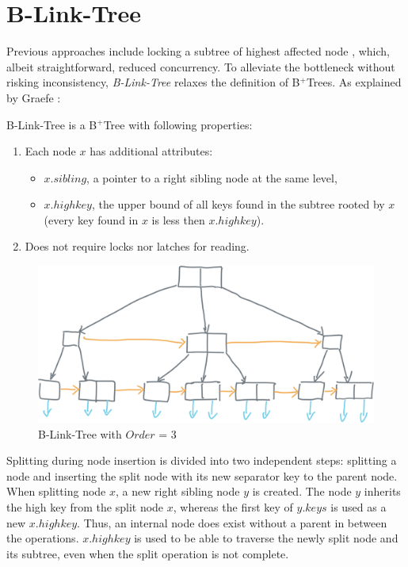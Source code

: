 \section{B-Link-Tree}\label{section:b-link-tree}

Previous approaches include locking a subtree of highest affected node \cite{samadi1976b}, which, albeit straightforward, reduced concurrency. To alleviate the bottleneck without risking inconsistency, \textit{B-Link-Tree} relaxes the definition of B$^+$Trees. As explained by Graefe \cite{goetz-tech}:

\begin{definition}
  B-Link-Tree is a B$^+$Tree with following properties:
  \begin{enumerate}
    \item Each node $x$ has additional attributes:
          \begin{itemize}
            \item $x.sibling$, a pointer to a right sibling node at the same level,
            \item $x.highkey$, the upper bound of all keys found in the subtree rooted by $x$ (every key found in $x$ is less then $x.highkey$).
          \end{itemize}
    \item Does not require locks nor latches for reading.
  \end{enumerate}
\end{definition}

\begin{figure}[H]
  \centering
  \includegraphics[width=\textwidth]{components/figure/b-link-tree.png}
  \caption{B-Link-Tree with $Order$ = 3}
  \label{figure:b-link-tree}
\end{figure}

Splitting during node insertion is divided into two independent steps: splitting a node and inserting the split node with its new separator key to the parent node. When splitting node $x$, a new right sibling node $y$ is created. The node $y$ inherits the high key from the split node $x$, whereas the first key of $y.keys$ is used as a new $x.highkey$. Thus, an internal node does exist without a parent in between the operations. $x.highkey$ is used to be able to traverse the newly split node and its subtree, even when the split operation is not complete.

